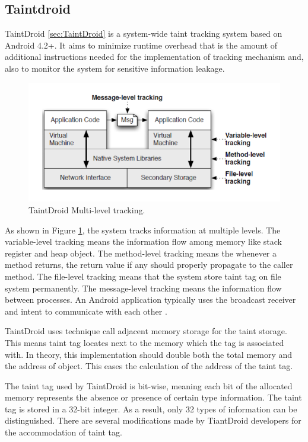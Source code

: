 \documentclass{article}
\begin{document}
\subsection{Taintdroid}
TaintDroid \ref{sec:TaintDroid} is a system-wide taint tracking system based on Android 4.2+. It aims to minimize runtime overhead that is the amount of additional instructions needed for the implementation of tracking mechanism and, also to monitor the system for sensitive information leakage.


\begin{figure}[ht]
  \centering
  \includegraphics[scale=0.6]{TaintDroid.png}
  \caption{TaintDroid Multi-level tracking.}
  \label{fig:TaintDroid}
\end{figure}

As shown in Figure \ref{fig:TaintDroid}, the system tracks information at multiple levels. The variable-level tracking means the information flow among memory like stack register and heap object. The method-level tracking means the whenever a method returns, the return value if any should properly propagate to the caller method. The file-level tracking means that the system store taint tag on file system permanently. The message-level tracking means the information flow between processes. An Android application typically uses the broadcast receiver and intent to communicate with each other
.

TaintDroid uses technique call adjacent memory storage for the taint storage. This means taint tag locates next to the memory which the tag is associated with. In theory, this implementation should double both the total memory and the address of object. This eases the calculation of the address of the taint tag.


The taint tag used by TaintDroid is bit-wise, meaning each bit of the allocated memory represents the absence or presence of certain type information. The taint tag is stored in a 32-bit integer. As a result, only 32 types of information can be distinguished. There are several modifications made by TiantDroid developers for the accommodation of taint tag.
\end{document}
